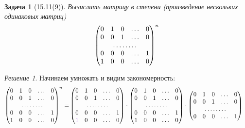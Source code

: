 \documentclass[a4paper,12pt]{article}
\newtheorem*{problem}{Задача}
\theoremstyle{definition}
\theoremstyle{remark}
\theoremstyle{remark}
\theoremstyle{remark}
\newtheorem*{solution}{Решение}
\begin{document}
  \begin{problem}[15.11(9)]
    Вычислить матрицу в степени (произведение нескольких одинаковых матриц)
    \[
      \begin{pmatrix}
        0 & 1 & 0 & \ldots & 0\\
        0 & 0 & 1 & \ldots & 0\\
        \hdotsfor{5}\\
        0 & 0 & 0 & \ldots & 1\\
        1 & 0 & 0 & \ldots & 0
      \end{pmatrix}^n
    \]
  \end{problem}
  
  \begin{solution}
    Начинаем умножать и видим закономерность:
    \begin{equation*}
    \begin{split}
      \begin{pmatrix}
        0 & 1 & 0 & \ldots & 0\\
        0 & 0 & 1 & \ldots & 0\\
        \hdotsfor{5}\\
        0 & 0 & 0 & \ldots & 1\\
        1 & 0 & 0 & \ldots & 0
      \end{pmatrix}^n
      = &\begin{pmatrix}
        0 & 1 & 0 & \ldots & 0\\
        0 & 0 & 1 & \ldots & 0\\
        \hdotsfor{5}\\
        0 & 0 & 0 & \ldots & 1\\
        \textcolor{light-purple}{1} & 0 & 0 & \ldots & 0
        \end{pmatrix}
        \cdot \begin{pmatrix}
        0 & 1 & 0 & \ldots & 0\\
        0 & 0 & 1 & \ldots & 0\\
        \hdotsfor{5}\\
        0 & 0 & 0 & \ldots & 1\\
        1 & 0 & 0 & \ldots & 0
        \end{pmatrix}
        \cdot \begin{pmatrix}
          0 & 1 & 0 & \ldots & 0\\
          0 & 0 & 1 & \ldots & 0\\
          \hdotsfor{5}\\
          0 & 0 & 0 & \ldots & 1\\

\end{pmatrix}
\end{split}
\end{equation*}
\end{solution}
\end{document}
